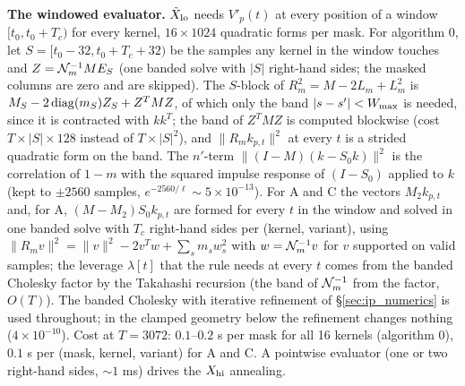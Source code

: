 \documentclass{article}
\numberwithin{equation}{section}   %
\begin{document}
{\bf The windowed evaluator.}  $\tilde X_{\rm lo}$ needs $V'_p(t)$ at every position of a window
$[t_0, t_0 + T_c)$ for every kernel, $16 \times 1024$ quadratic forms per mask.  For algorithm 0, let
$S = [t_0 - 32, t_0 + T_c + 32)$ be the samples any kernel in the window touches and
$Z = {\cal N}_m^{-1}ME_S$ (one banded solve with $|S|$ right-hand sides; the masked columns are zero and
are skipped).  The $S$-block of $R_m^2 = M - 2L_m + L_m^2$ is $M_S - 2\,{\rm diag}(m_S)Z_S + Z^TMZ$, of
which only the band $|s - s'| < W_{\rm max}$ is needed, since it is contracted with $kk^T$; the band of
$Z^TMZ$ is computed blockwise (cost $T \times |S| \times 128$ instead of $T \times |S|^2$), and
$\|R_mk_{p,t}\|^2$ at every $t$ is a strided quadratic form on the band.  The $n'$-term
$\|(I - M)(k - S_0k)\|^2$ is the correlation of $1 - m$ with the squared impulse response of
$(I - S_0)$ applied to $k$ (kept to $\pm 2560$ samples, $e^{-2560/\ell} \sim 5 \times 10^{-13}$).  For A
and C the vectors $M_2k_{p,t}$ and, for A, $(M - M_2)S_0k_{p,t}$ are formed for every $t$ in the window
and solved in one banded solve with $T_c$ right-hand sides per (kernel, variant), using
$\|R_mv\|^2 = \|v\|^2 - 2v^Tw + \sum_s m_sw_s^2$ with $w = {\cal N}_m^{-1}v$ for $v$ supported on valid
samples; the leverage $\lambda[t]$ that the rule needs at every $t$ comes from the banded Cholesky
factor by the Takahashi recursion (the band of ${\cal N}_m^{-1}$ from the factor, $O(T)$).  The banded
Cholesky with iterative refinement of \S\ref{sec:ip_numerics} is used throughout; in the clamped
geometry below the refinement changes nothing ($4 \times 10^{-10}$).  Cost at $T = 3072$: $0.1$--$0.2$ s
per mask for all 16 kernels (algorithm 0), $0.1$ s per (mask, kernel, variant) for A and C.  A pointwise
evaluator (one or two right-hand sides, $\sim 1$ ms) drives the $X_{\rm hi}$ annealing.
\end{document}
